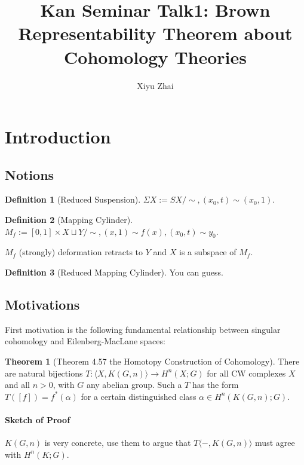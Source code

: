 \documentclass[11pt, oneside]{article}   	%
\title{Kan Seminar Talk1: Brown Representability Theorem about Cohomology Theories}
\author{Xiyu Zhai}
\date{}							%
\theoremstyle{definition}
\newtheorem*{defn}{Definition}
\newtheorem*{thm}{Theorem}
\begin{document}
\maketitle
\tableofcontents

\section{Introduction}

\subsection{Notions}

\begin{defn}[Reduced Suspension]
	$\Sigma X:=SX/\sim, (x_0,t)\sim (x_0,1)$.
\end{defn}

\begin{defn}[Mapping Cylinder]
	$M_f:=[0,1]\times X\sqcup Y/\sim, (x,1)\sim f(x), (x_0,t)\sim y_0$.
\end{defn}

\begin{rmk}
	$M_f$ (strongly) deformation retracts to $Y$ and $X$ is a subspace of $M_f$.
\end{rmk}

\begin{defn}[Reduced Mapping Cylinder]
	You can guess.
\end{defn}

\subsection{Motivations}

First motivation is the following fundamental relationship between singular cohomology and Eilenberg-MacLane spaces:

\begin{thm}
	[Theorem 4.57 the Homotopy Construction of Cohomology] There are natural bijections $T:\langle X, K(G,n)\rangle \to H^n(X;G)$ for all CW complexes $X$ and all $n>0$, with $G$ any abelian group. Such a $T$ has the form $T([f])=f^*(\alpha)$ for a certain distinguished class $\alpha\in H^n(K(G,n);G)$.
\end{thm}

\paragraph{Sketch of Proof} $K(G,n)$ is very concrete, use them to argue that $T\langle -, K(G,n)\rangle$ must agree with $H^n(K;G)$.
\end{document}
